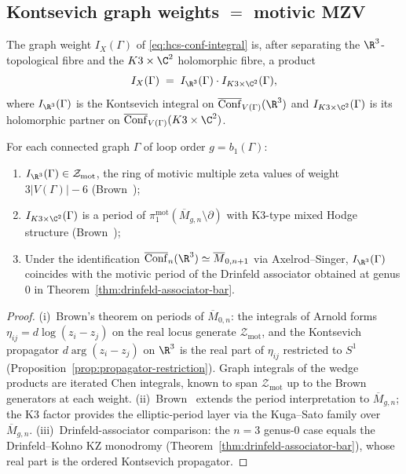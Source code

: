 \subsection{Kontsevich graph weights $=$ motivic MZV}
\label{subsec:hcs-motivic-mzv}

The graph weight $I_{X}(\Gamma)$ of \eqref{eq:hcs-conf-integral} is,
after separating the $\R^{3}$-topological fibre and the $K3\times\C^{2}$
holomorphic fibre, a product
\begin{equation}\label{eq:graph-weight-factorisation}
 I_{X}(\Gamma) \;=\; I_{\R^{3}}(\Gamma)\cdot I_{K3\times\C^{2}}(\Gamma),
\end{equation}
where $I_{\R^{3}}(\Gamma)$ is the Kontsevich integral on
$\overline{\Conf}_{V(\Gamma)}(\R^{3})$ and $I_{K3\times\C^{2}}(\Gamma)$
is its holomorphic partner on
$\overline{\Conf}_{V(\Gamma)}(K3\times\C^{2})$.

\begin{theorem}[Periods on $\overline{M}_{g,n}$ $=$ motivic MZVs]
\label{thm:hcs-motivic}
\ClaimStatusProvedElsewhere
For each connected graph $\Gamma$ of loop order $g = b_{1}(\Gamma)$:
\begin{enumerate}[label=\textup{(\roman*)}]
\item $I_{\R^{3}}(\Gamma) \in \mathcal{Z}_{\mathrm{mot}}$, the ring of
motivic multiple zeta values of weight $3|V(\Gamma)|-6$
(Brown~\cite{Brown2012});
\item $I_{K3\times\C^{2}}(\Gamma)$ is a period of
$\pi_{1}^{\mathrm{mot}}(\overline{M}_{g,n}\setminus\partial)$ with
K3-type mixed Hodge structure
(Brown~\cite{Brown2017});
\item Under the identification
$\overline{\Conf}_{n}(\R^{3})\simeq\overline{M}_{0,n+1}$ via
Axelrod--Singer, $I_{\R^{3}}(\Gamma)$ coincides with the motivic period of the
Drinfeld associator obtained at genus $0$ in
Theorem~\ref{thm:drinfeld-associator-bar}.
\end{enumerate}
\end{theorem}

\begin{proof}
(i)~Brown's theorem on periods of $\overline{M}_{0,n}$: the integrals of
Arnold forms $\eta_{ij} = d\log(z_{i}-z_{j})$ on the real locus
generate $\mathcal{Z}_{\mathrm{mot}}$, and the Kontsevich propagator
$d\arg(z_{i}-z_{j})$ on $\R^{3}$ is the real part of $\eta_{ij}$ restricted
to $S^{1}$ (Proposition~\ref{prop:propagator-restriction}). Graph
integrals of the wedge products are iterated Chen integrals, known to
span $\mathcal{Z}_{\mathrm{mot}}$ up to the Brown generators at each
weight.
(ii)~Brown~\cite{Brown2017} extends the period interpretation to
$\overline{M}_{g,n}$; the K3 factor provides the elliptic-period layer
via the Kuga--Sato family over $\overline{M}_{g,n}$.
(iii)~Drinfeld-associator comparison: the $n = 3$ genus-0 case equals
the Drinfeld--Kohno KZ monodromy (Theorem~\ref{thm:drinfeld-associator-bar}),
whose real part is the ordered Kontsevich propagator.
\end{proof}


